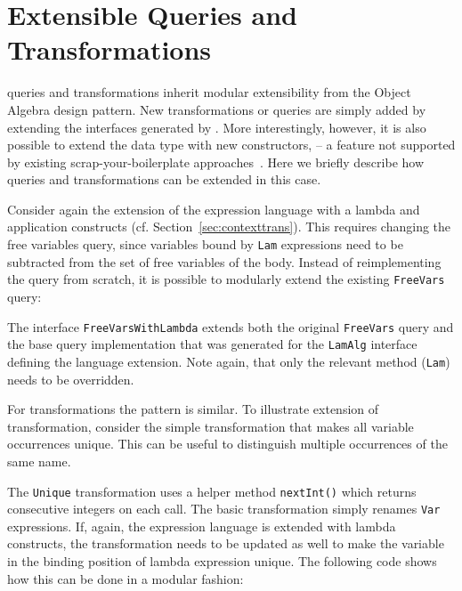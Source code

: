

\section{Extensible Queries and Transformations}
\label{SECT:extensible}


\noindent \name queries and transformations inherit  modular extensibility from the Object Algebra design pattern.
New transformations or queries are simply added by extending the interfaces generated by \name.
More interestingly, however, it is also possible to extend the data type with new constructors, -- a feature not supported by existing scrap-your-boilerplate approaches~\cite{ralf03syb,lammel04syb}.
Here we briefly describe how queries and transformations can be extended in this case.


Consider again the extension of the expression language with a lambda and application constructs (cf. Section~\ref{sec:contexttrans}).
This requires changing the free variables query, since variables bound by \lstinline{Lam} expressions need to be subtracted from the set of free variables of the body.
Instead of reimplementing the query from scratch, it is possible to modularly extend the existing \lstinline{FreeVars} query:


The interface \lstinline{FreeVarsWithLambda} extends both the original \lstinline{FreeVars} query and the base query implementation that was generated for the \lstinline{LamAlg} interface defining the language extension.
Note again, that only the relevant method (\lstinline{Lam}) needs to be overridden.


For transformations the pattern is similar.
To illustrate extension of transformation, consider the simple transformation that makes all variable occurrences unique.
This can be useful to distinguish multiple occurrences of the same name.


The \lstinline{Unique} transformation uses a helper method \lstinline{nextInt()} which returns consecutive integers on each call.
The basic transformation simply renames \lstinline{Var} expressions.
If, again, the expression language is extended with lambda constructs, the transformation needs to be updated as well to make the variable in the binding position of lambda expression unique.
The following code shows how this can be done in a modular fashion:

